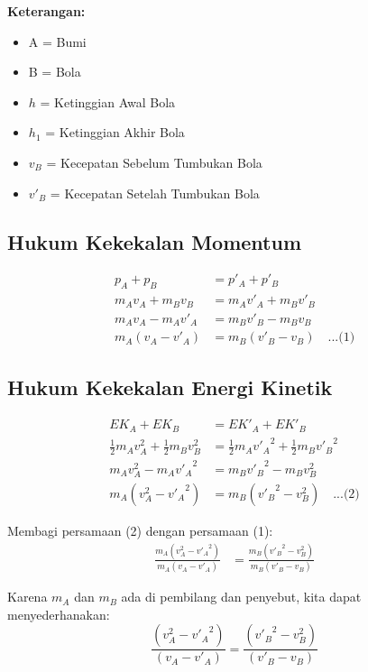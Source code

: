\newpage
\textbf{Keterangan:}
\begin{itemize}
    \item A = Bumi
    \item B = Bola
    \item $h$ = Ketinggian Awal Bola
    \item $h_1$ = Ketinggian Akhir Bola
    \item $v_B$ = Kecepatan Sebelum Tumbukan Bola
    \item $v'_B$ = Kecepatan Setelah Tumbukan Bola
\end{itemize}
\subsection*{Hukum Kekekalan Momentum}
\begin{align}
    p_A + p_B &= p'_A + p'_B \\
    m_A v_A + m_B v_B &= m_A v'_A + m_B v'_B \\
    m_A v_A - m_A v'_A &= m_B v'_B - m_B v_B \\
    m_A (v_A - v'_A) &= m_B (v'_B - v_B) \quad \text{...(1)}
\end{align}

\subsection*{Hukum Kekekalan Energi Kinetik}
\begin{align}
    EK_A + EK_B &= EK'_A + EK'_B \\
    \frac{1}{2} m_A v_A^2 + \frac{1}{2} m_B v_B^2 &= \frac{1}{2} m_A {v'_A}^2 + \frac{1}{2} m_B {v'_B}^2 \\
    m_A v_A^2 - m_A {v'_A}^2 &= m_B {v'_B}^2 - m_B v_B^2 \\
    m_A (v_A^2 - {v'_A}^2) &= m_B ({v'_B}^2 - v_B^2) \quad \text{...(2)}
\end{align}

Membagi persamaan (2) dengan persamaan (1):
\begin{align}
    \frac{m_A (v_A^2 - {v'_A}^2)}{m_A (v_A - v'_A)} &= \frac{m_B ({v'_B}^2 - v_B^2)}{m_B (v'_B - v_B)}
\end{align}

Karena \( m_A \) dan \( m_B \) ada di pembilang dan penyebut, kita dapat menyederhanakan:
\begin{equation}
    \frac{(v_A^2 - {v'_A}^2)}{(v_A - v'_A)} = \frac{({v'_B}^2 - v_B^2)}{(v'_B - v_B)}
\end{equation}

